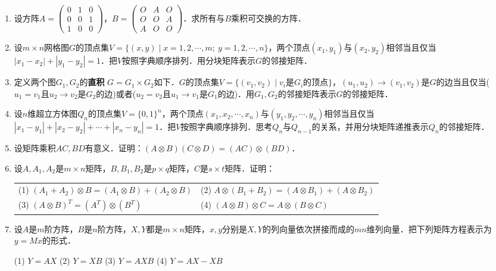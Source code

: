 \documentclass[a4paper,fontset=windows]{ctexbook}
\theoremstyle{definition}
\begin{document}
\begin{enumerate}
\item 设方阵$A=\begin{pmatrix}0&1&0 \\ 0&0&1 \\ 1&0&0\end{pmatrix}$，$B=\begin{pmatrix}O&A&O \\ O&O&A \\ A&O&O\end{pmatrix}$．求所有与$B$乘积可交换的方阵．

\item 设$m\times n$网格图$G$的顶点集$V=\{(x,y)\mid x=1,2,\cdots,m;~y=1,2,\cdots,n\}$，两个顶点$(x_1,y_1)$与$(x_2,y_2)$相邻当且仅当$|x_1-x_2|+|y_1-y_2|=1$．把$V$按照字典顺序排列．用分块矩阵表示$G$的邻接矩阵．

\item 定义两个图$G_1,G_2$的{\bf 直积} $G=G_1\times G_2$如下．$G$的顶点集$V=\{(v_1,v_2)\mid\text{$v_i$是$G_i$的顶点}\}$，$(u_1,u_2)\to(v_1,v_2)$是$G$的边当且仅当($u_1=v_1$且$u_2\to v_2$是$G_2$的边)或者($u_2=v_2$且$u_1\to v_1$是$G_1$的边)．用$G_1,G_2$的邻接矩阵表示$G$的邻接矩阵．

\item 设$n$维超立方体图$Q_n$的顶点集$V=\{0,1\}^n$，两个顶点$(x_1,x_2,\cdots,x_n)$与$(y_1,y_2,\cdots,y_n)$相邻当且仅当$|x_1-y_1|+|x_2-y_2|+\cdots+|x_n-y_n|=1$．把$V$按照字典顺序排列．思考$Q_n$与$Q_{n-1}$的关系，并用分块矩阵递推表示$Q_n$的邻接矩阵．

\item 设矩阵乘积$AC,BD$有意义．证明：$(A\otimes B)(C\otimes D)=(AC)\otimes(BD)$．

\item 设$A,A_1,A_2$是$m\times n$矩阵，$B,B_1,B_2$是$p\times q$矩阵，$C$是$s\times t$矩阵．证明：

\hspace*{-6pt}\begin{tabular}{l@{\qquad}l}
(1) $(A_1+A_2)\otimes B=(A_1\otimes B)+(A_2\otimes B)$ &
(2) $A\otimes(B_1+B_2)=(A\otimes B_1)+(A\otimes B_2)$ \\
(3) $(A\otimes B)^T=(A^T)\otimes(B^T)$ &
(4) $(A\otimes B)\otimes C=A\otimes(B\otimes C)$
\end{tabular}

\item 设$A$是$m$阶方阵，$B$是$n$阶方阵，$X,Y$都是$m\times n$矩阵，$x,y$分别是$X,Y$的列向量依次拼接而成的$mn$维列向量．把下列矩阵方程表示为$y=Mx$的形式．

(1) $Y=AX$ \qquad\qquad (2) $Y=XB$ \qquad\qquad (3) $Y=AXB$ \qquad\qquad (4) $Y=AX-XB$

\end{enumerate}
\end{document}
